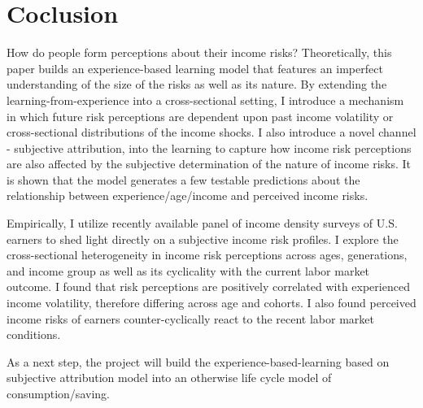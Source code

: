 \documentclass[12pt,notitlepage,onecolumn,aps,pra]{article}
\begin{document}
    \hypertarget{coclusion}{%
\section{Coclusion}\label{coclusion}}

How do people form perceptions about their income risks? Theoretically,
this paper builds an experience-based learning model that features an
imperfect understanding of the size of the risks as well as its nature.
By extending the learning-from-experience into a cross-sectional
setting, I introduce a mechanism in which future risk perceptions are
dependent upon past income volatility or cross-sectional distributions
of the income shocks. I also introduce a novel channel - subjective
attribution, into the learning to capture how income risk perceptions
are also affected by the subjective determination of the nature of
income risks. It is shown that the model generates a few testable
predictions about the relationship between experience/age/income and
perceived income risks.

Empirically, I utilize recently available panel of income density
surveys of U.S. earners to shed light directly on a subjective income
risk profiles. I explore the cross-sectional heterogeneity in income
risk perceptions across ages, generations, and income group as well as
its cyclicality with the current labor market outcome. I found that risk
perceptions are positively correlated with experienced income
volatility, therefore differing across age and cohorts. I also found
perceived income risks of earners counter-cyclically react to the recent
labor market conditions.

As a next step, the project will build the experience-based-learning
based on subjective attribution model into an otherwise life cycle model
of consumption/saving.


    
    



    
\end{document}
